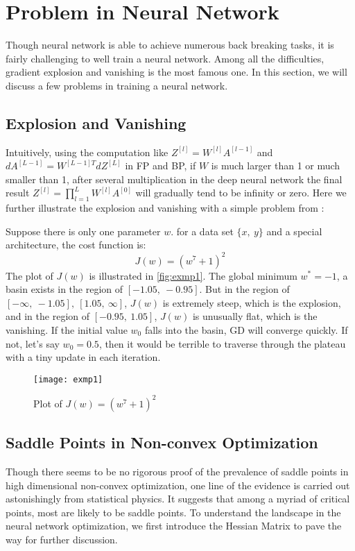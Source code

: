 \section{Problem in Neural Network}
\label{sec:Problem}

Though neural network is able to achieve numerous back breaking tasks, it is 
fairly challenging to well train a neural network. Among all the difficulties,
gradient explosion and vanishing is the most famous one. In this section, we
will discuss a few problems in training a neural network.

\subsection{Explosion and Vanishing}
Intuitively, using the computation like 
$ Z^{[l]} = W^{[l]}A^{[l-1]} $ and 
$ dA^{[L-1]} = W^{[L-1]T}dZ^{[L]} $ in FP and BP, if $ W $ is much larger 
than 1 or much smaller than 1, after several multiplication in the deep 
neural network the final result $ Z^{[l]} = \prod\limits_{l=1}^LW^{[l]}A^{[0]} $
will gradually tend to be infinity or zero. Here we further illustrate 
the explosion and vanishing with a simple problem from \parencite{shamir2018exponential}:

\begin{exmp}
    Suppose there is only one parameter $ w $.
    for a data set $\{x,\ y\}$ and a special architecture, 
    the cost function is:
    \begin{equation}
        J(w) = (w^7 + 1)^2
    \end{equation}
    The plot of $J(w)$ is illustrated in \autoref{fig:exmp1}. The global
    minimum $ w^* = -1 $, a basin exists in the region of $ [-1.05,\ -0.95] $.
    But in the region of $ [-\infty,\ -1.05],\ [1.05,\ \infty] $, $ J(w) $
    is extremely steep, which is the explosion, and in the region of 
    $ [-0.95,\ 1.05] $, $ J(w) $ is unusually flat, which is the vanishing.
    If the initial value $ w_0 $ falls into the basin, GD will converge 
    quickly. If not, let's say $ w_0 = 0.5 $, then it would be terrible to
    traverse through the plateau with a tiny update in each iteration.
\end{exmp}

\begin{figure}[H]
    \centering
    \texttt{[image: exmp1]}
    \caption{\label{fig:exmp1}Plot of $ J(w) = (w^7 + 1)^2 $}
\end{figure}

\subsection{Saddle Points in Non-convex Optimization}
Though there seems to be no rigorous proof of the prevalence of saddle points 
in high dimensional non-convex optimization, one line of the evidence 
is carried out astonishingly from statistical physics. It suggests that 
among a myriad of critical points, most are likely to be saddle points.
To understand the landscape in the neural network optimization, we first
introduce the Hessian Matrix to pave the way for further discussion.

